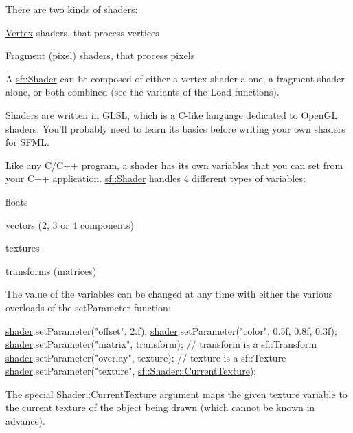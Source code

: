 There are two kinds of shaders\-: \begin{DoxyItemize}
\item \hyperlink{classsf_1_1_vertex}{Vertex} shaders, that process vertices \item Fragment (pixel) shaders, that process pixels\end{DoxyItemize}
A \hyperlink{classsf_1_1_shader}{sf\-::\-Shader} can be composed of either a vertex shader alone, a fragment shader alone, or both combined (see the variants of the Load functions).

Shaders are written in G\-L\-S\-L, which is a C-\/like language dedicated to Open\-G\-L shaders. You'll probably need to learn its basics before writing your own shaders for S\-F\-M\-L.

Like any C/\-C++ program, a shader has its own variables that you can set from your C++ application. \hyperlink{classsf_1_1_shader}{sf\-::\-Shader} handles 4 different types of variables\-: \begin{DoxyItemize}
\item floats \item vectors (2, 3 or 4 components) \item textures \item transforms (matrices)\end{DoxyItemize}
The value of the variables can be changed at any time with either the various overloads of the set\-Parameter function\-: 
\begin{DoxyCode}
\hyperlink{gl3_8h_a57b2a96adb1d51204909a82d861e395e}{shader}.setParameter(\textcolor{stringliteral}{"offset"}, 2.f);
\hyperlink{gl3_8h_a57b2a96adb1d51204909a82d861e395e}{shader}.setParameter(\textcolor{stringliteral}{"color"}, 0.5f, 0.8f, 0.3f);
\hyperlink{gl3_8h_a57b2a96adb1d51204909a82d861e395e}{shader}.setParameter(\textcolor{stringliteral}{"matrix"}, transform); \textcolor{comment}{// transform is a sf::Transform}
\hyperlink{gl3_8h_a57b2a96adb1d51204909a82d861e395e}{shader}.setParameter(\textcolor{stringliteral}{"overlay"}, texture); \textcolor{comment}{// texture is a sf::Texture}
\hyperlink{gl3_8h_a57b2a96adb1d51204909a82d861e395e}{shader}.setParameter(\textcolor{stringliteral}{"texture"}, \hyperlink{classsf_1_1_shader_ac84c7953eec2e19358ea6e2cc5385b8d}{sf::Shader::CurrentTexture});
\end{DoxyCode}


The special \hyperlink{classsf_1_1_shader_ac84c7953eec2e19358ea6e2cc5385b8d}{Shader\-::\-Current\-Texture} argument maps the given texture variable to the current texture of the object being drawn (which cannot be known in advance).

